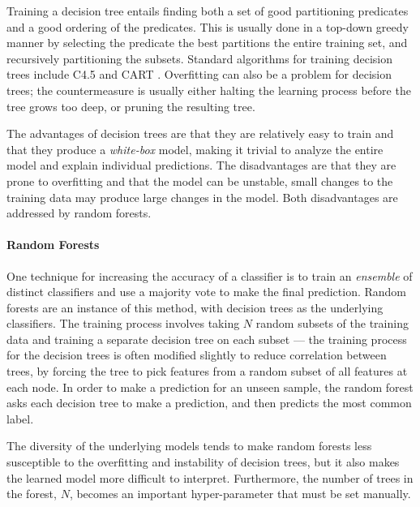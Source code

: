 Training a decision tree entails finding both a set of good partitioning
predicates and a good ordering of the predicates.
%
This is usually done in a top-down greedy manner by selecting the
predicate the best partitions the entire training set, and recursively
partitioning the subsets.
%
Standard algorithms for training decision trees include C4.5
\citep{Quinlan1993-de} and CART \citep{Breiman1984-qy}.
%
Overfitting can also be a problem for decision trees; the countermeasure
is usually either halting the learning process before the tree grows too
deep, or pruning the resulting tree.

The advantages of decision trees are that they are relatively easy to
train and that they produce a \emph{white-box} model, making it trivial
to analyze the entire model and explain individual predictions.
%
The disadvantages are that they are prone to overfitting and that the
model can be unstable, \ie small changes to the training data may
produce large changes in the model.
%
Both disadvantages are addressed by random forests.

\paragraph{Random Forests}
One technique for increasing the accuracy of a classifier is to train an
\emph{ensemble} of distinct classifiers and use a majority vote
to make the final prediction.
%
Random forests are an instance of this method, with decision
trees as the underlying classifiers.
%
The training process involves taking $N$ random subsets of the training
data and training a separate decision tree on each subset --- the
training process for the decision trees is often modified slightly to
reduce correlation between trees, by forcing the tree to pick features
from a random subset of all features at each node.
%
In order to make a prediction for an unseen sample, the random forest
asks each decision tree to make a prediction, and then predicts the most
common label.

The diversity of the underlying models tends to make random forests less
susceptible to the overfitting and instability of decision trees, but it
also makes the learned model more difficult to interpret.
%
Furthermore, the number of trees in the forest, $N$, becomes an important
hyper-parameter that must be set manually.


